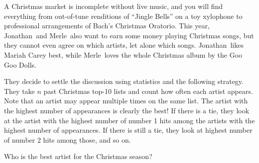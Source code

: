 








A Christmas market is incomplete without live music, and you will find everything from out-of-tune renditions of ``Jingle Bells'' on a toy xylophone to professional arrangements of Bach's Christmas Oratorio.
This year, Jonathan~and Merle~also want to earn some money playing Christmas songs, but they cannot even agree on which artists, let alone which songs.
Jonathan~likes Mariah Carey best, while Merle~loves the whole Christmas album by the Goo Goo Dolls.

They decide to settle the discussion using statistics and the following strategy.
They take $n$ past Christmas top-10 lists and count how often each artist appears.
Note that an artist may appear multiple times on the same list.
The artist with the highest number of appearances is clearly the best!
If there is a tie, they look at the artist with the highest number of number 1 hits
among the artists with the highest number of appearances.
If there is still a tie, they look at highest number of number 2 hits among those, and so on.

Who is the best artist for the Christmas season?



